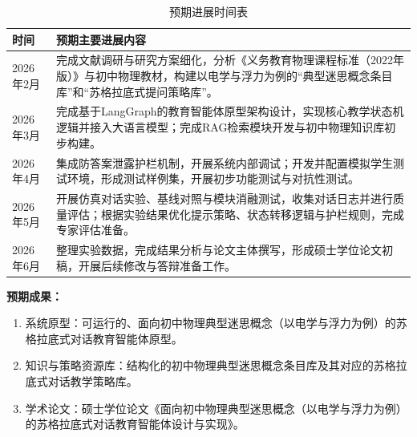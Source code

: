 \begin{table}[htbp]
    \centering
    \caption{预期进展时间表}
    \label{tab:progress-timetable}
    \begin{tabular}{l p{\dimexpr\textwidth - 2.5cm - 4\tabcolsep\relax}}
        \hline
        时间 & 预期主要进展内容 \\
        \hline
        2026年2月 & 完成文献调研与研究方案细化，分析《义务教育物理课程标准（2022年版）》与初中物理教材，构建以电学与浮力为例的“典型迷思概念条目库”和“苏格拉底式提问策略库”。 \\
        \hline
        2026年3月 & 完成基于LangGraph的教育智能体原型架构设计，实现核心教学状态机逻辑并接入大语言模型；完成RAG检索模块开发与初中物理知识库初步构建。 \\
        \hline
        2026年4月 & 集成防答案泄露护栏机制，开展系统内部调试；开发并配置模拟学生测试环境，形成测试样例集，开展初步功能测试与对抗性测试。 \\
        \hline
        2026年5月 & 开展仿真对话实验、基线对照与模块消融测试，收集对话日志并进行质量评估；根据实验结果优化提示策略、状态转移逻辑与护栏规则，完成专家评估准备。 \\
        \hline
        2026年6月 & 整理实验数据，完成结果分析与论文主体撰写，形成硕士学位论文初稿，开展后续修改与答辩准备工作。 \\
        \hline
    \end{tabular}
\end{table}


\noindent \textbf{预期成果：}
\begin{enumerate}
    \item 系统原型：可运行的、面向初中物理典型迷思概念（以电学与浮力为例）的苏格拉底式对话教育智能体原型。
    \item 知识与策略资源库：结构化的初中物理典型迷思概念条目库及其对应的苏格拉底式对话教学策略库。
    \item 学术论文：硕士学位论文《面向初中物理典型迷思概念（以电学与浮力为例）的苏格拉底式对话教育智能体设计与实现》。
\end{enumerate}


